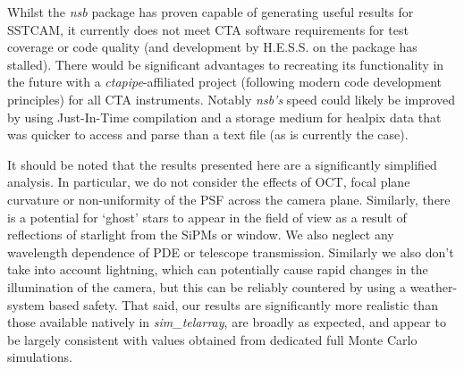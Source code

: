 Whilst the \textit{nsb} package has proven capable of generating useful results for SSTCAM, it currently does not meet CTA software requirements for test coverage or code quality (and development by H.E.S.S. on the package has stalled). There would be significant advantages to recreating its functionality in the future with a \textit{ctapipe}-affiliated project (following modern code development principles) for all CTA instruments. Notably \textit{nsb's} speed could likely be improved by using Just-In-Time compilation and a storage medium for healpix data that was quicker to access and parse than a text file (as is currently the case).

It should be noted that the results presented here are a significantly simplified analysis. In particular, we do not consider the effects of OCT, focal plane curvature or non-uniformity of the PSF across the camera plane. Similarly, there is a potential for `ghost' stars to appear in the field of view as a result of reflections of starlight from the SiPMs or window. We also neglect any wavelength dependence of PDE or telescope transmission. Similarly we also don't take into account lightning, which can potentially cause rapid changes in the illumination of the camera, but this can be reliably countered by using a weather-system based safety. That said, our results are significantly more realistic than those available natively in \textit{sim\_telarray}, are broadly as expected, and appear to be largely consistent with values obtained from dedicated full Monte Carlo simulations.



